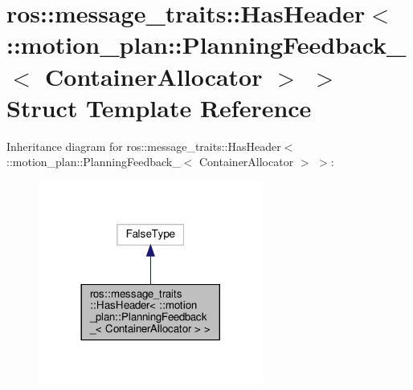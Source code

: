 \hypertarget{structros_1_1message__traits_1_1HasHeader_3_01_1_1motion__plan_1_1PlanningFeedback___3_01ContainerAllocator_01_4_01_4}{}\section{ros\+:\+:message\+\_\+traits\+:\+:Has\+Header$<$ \+:\+:motion\+\_\+plan\+:\+:Planning\+Feedback\+\_\+$<$ Container\+Allocator $>$ $>$ Struct Template Reference}
\label{structros_1_1message__traits_1_1HasHeader_3_01_1_1motion__plan_1_1PlanningFeedback___3_01ContainerAllocator_01_4_01_4}


Inheritance diagram for ros\+:\+:message\+\_\+traits\+:\+:Has\+Header$<$ \+:\+:motion\+\_\+plan\+:\+:Planning\+Feedback\+\_\+$<$ Container\+Allocator $>$ $>$\+:
\nopagebreak
\begin{figure}[H]
\begin{center}
\leavevmode
\includegraphics[width=209pt]{structros_1_1message__traits_1_1HasHeader_3_01_1_1motion__plan_1_1PlanningFeedback___3_01Contain41ea71417e29e0efef0e8a448bf219bb}
\end{center}
\end{figure}


